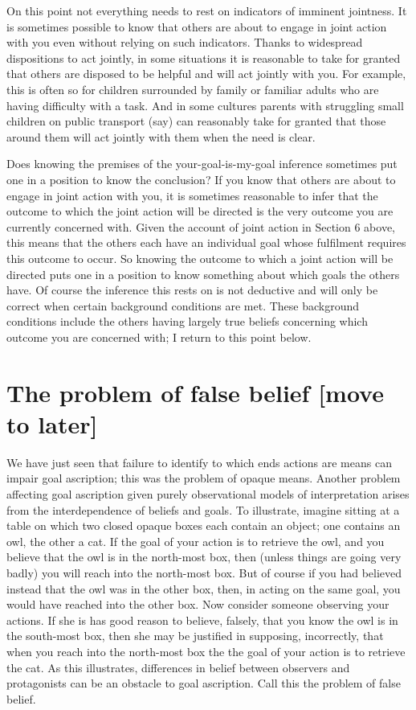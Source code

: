 \documentclass[12pt,a4paper]{extarticle}
\begin{document}
On this point not everything needs to rest on indicators of imminent jointness.
It is sometimes possible to know that others are about to engage in joint action with you even without relying on such indicators.  
Thanks to widespread dispositions to act jointly, in some situations it is reasonable to take for granted that others are disposed to be helpful and will act jointly with you.  
For example, this is often so for children surrounded by family or familiar adults who are having difficulty with a task.  
And in some cultures parents with struggling small children on public transport (say) can reasonably take for granted that those around them will act jointly with them when the need is clear.

Does knowing the premises of the your-goal-is-my-goal inference sometimes put one in a position to know the conclusion?  
If you know that others are about to engage in joint action with you, it is sometimes reasonable to infer that the outcome to which the joint action will be directed is the very outcome you are currently concerned with.  
Given the account of joint action in Section 6 above, this means that the others each have an individual goal whose fulfilment requires this outcome to occur.  
So knowing the outcome to which a joint action will be directed puts one in a position to know something about which goals the others have.  
Of course the inference this rests on is not deductive and will only be correct when certain background conditions are met.  
These background conditions include the others having largely true beliefs concerning which outcome you are concerned with; I return to this point below.  




\section{The problem of false belief [move to later]}
We have just seen that 
failure to identify to which ends actions are means can impair goal ascription; this was the problem of opaque means.
Another problem 
affecting goal ascription given purely observational models of interpretation
 arises from the interdependence of beliefs and goals.
To illustrate, 
imagine sitting at a table on which two closed opaque boxes each contain an object; one contains an owl, the other a cat.
If the goal of your action is to retrieve the owl, 
and you believe that the owl is in the north-most box,
then 
(unless things are going very badly) 
you will reach into the north-most box.
But of course if you had believed instead that the owl was in the other box,
then, in acting on the same goal, you would have reached into the other box.
Now consider someone observing your actions.
If she is has good reason to believe, falsely, that you know the owl is in the south-most box,
then she may be justified in supposing, incorrectly, that when you reach into the north-most box the the goal of your action is to retrieve the cat.
As this illustrates,
differences in belief between observers and protagonists can be an obstacle to goal ascription.
Call this the problem of false belief.
\end{document}
